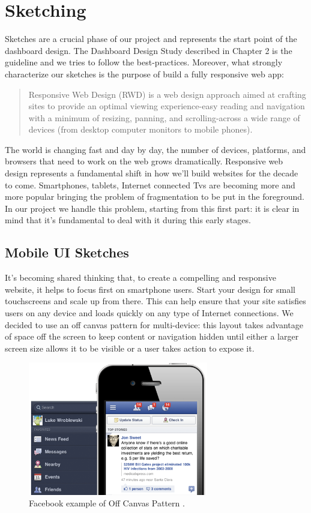 \documentclass[a4paper,12pt]{report}
\begin{document}
\section{Sketching}
Sketches are a crucial phase of our project and represents the start point of the dashboard design. The Dashboard Design Study described in Chapter 2 is the guideline and we tries to follow the best-practices.
Moreover, what strongly characterize our sketches is the purpose of build a fully responsive web app: 
\begin{quote} 
    Responsive Web Design (RWD) is a web design approach aimed at crafting sites to provide an optimal viewing experience-easy reading and navigation with a minimum of resizing, panning, and scrolling-across a wide range of devices (from desktop computer monitors to mobile phones).
\end{quote}
The world is changing fast and day by day, the number of devices, platforms, and browsers that need to work on the web grows dramatically. Responsive web design represents a fundamental shift in how we'll build websites for the decade to come.
Smartphones, tablets, Internet connected Tvs are becoming more and more popular bringing the problem of fragmentation to be put in the foreground.
In our project we handle this problem, starting from this first part: it is clear in mind that it's fundamental to deal with it during this early stages.

\subsection {Mobile UI Sketches}
It's becoming shared thinking that, to create a compelling and responsive website, it helps to focus first on smartphone users. Start your design for small touchscreens and scale up from there. This can help ensure that your site satisfies users on any device and loads quickly on any type of Internet connections.
We decided to use an off canvas pattern for multi-device: this layout takes advantage of space off the screen to keep content or navigation hidden until either a larger screen size allows it to be visible or a user takes action to expose it.
\\[0.2cm]
\begin{figure}[h!]
  \caption{Facebook example of Off Canvas Pattern .}
  \centering
    \includegraphics[width=0.7\textwidth]{pics/UISketches/offCanvas}
\end{figure}
\end{document}
